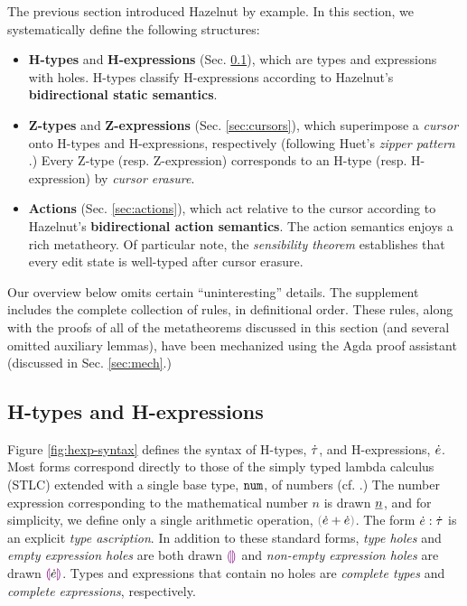 
The previous section introduced Hazelnut by example. In this section, we
systematically define the following structures:
\begin{itemize}[itemsep=0px,partopsep=2px,topsep=2px]
\item \textbf{H-types} and \textbf{H-expressions} (Sec. \ref{sec:holes}),
  which are types and expressions with {holes}. H-types classify
  H-expressions according to Hazelnut's \textbf{bidirectional static
    semantics}.

\item \textbf{Z-types} and \textbf{Z-expressions} (Sec. \ref{sec:cursors}),
  which superimpose\- a \emph{cursor} onto H-types and H-expressions,
  respectively (following Huet's \emph{zipper pattern}
  \cite{JFP::Huet1997}.) Every Z-type (resp. Z-expression) corresponds to
  an H-type (resp. H-expression) by \emph{cursor erasure}.

\item \textbf{Actions} (Sec. \ref{sec:actions}), which act relative to the
  cursor according to Hazelnut's \textbf{bidirectional action
    semantics}. The action semantics enjoys a rich metatheory. Of
  particular note, the \emph{sensibility theorem} establishes that every
  edit state is well-typed after cursor erasure.
\end{itemize}

Our overview below omits certain ``uninteresting'' details. The supplement 
includes the complete collection of rules, in definitional order. These
rules, along with the proofs of all of the metatheorems discussed in this section (and several omitted auxiliary lemmas), have been
mechanized using the Agda proof assistant \cite{norell:thesis} (discussed in Sec. \ref{sec:mech}.) 

\subsection{H-types and H-expressions}\label{sec:holes}
Figure \ref{fig:hexp-syntax} defines the syntax of H-types, $\dot{\tau}$, and
H-expressions, $\dot{e}$. Most forms correspond directly to those of the
simply typed lambda calculus (STLC) extended with a single base type,
$\mathtt{num}$, of numbers (cf. \cite{pfpl}.) The number expression corresponding
to the mathematical number $n$ is drawn $\underline{n}$, and for simplicity, we
define only a single arithmetic operation, $\hadd{\hexp}{\hexp}$. The form
$\dot{e} : \dot{\tau}$ is an explicit \emph{type ascription}. In addition to these standard forms, \emph{type holes} and \emph{empty
  expression holes} are both drawn $\textcolor{violet}{\llparenthesis}\textcolor{violet}{\rrparenthesis}$ and \emph{non-empty expression
  holes} are drawn $\textcolor{violet}{\llparenthesis}\dot{e}\textcolor{violet}{\rrparenthesis}$. 
Types and expressions that contain no holes are \emph{complete types} and
\emph{complete expressions}, respectively. 

